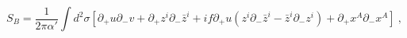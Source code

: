 \begin{equation}
 S_B = \frac{1}{2\pi \alpha '} \int d^2 \sigma [
  \partial_+ u \partial _- v + \partial _+ z^i \partial_- \bar{z}^i
    +  i f \partial _+ u 
  ( z^i \partial_- \bar{z}^i - \bar{z}^i \partial_- z^i ) 
  + \partial _+ x^A \partial _- x^A] ~,
\label{sigmab}
\end{equation}

